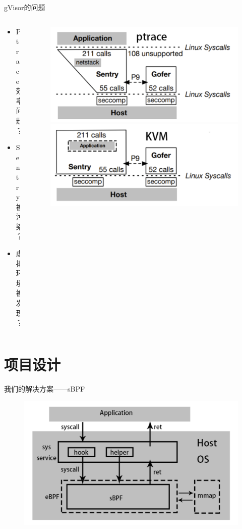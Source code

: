 \documentclass[UTF8,aspectratio=169,fontset=macnew,xcolor=table]{ctexbeamer}
\begin{document}
\begin{frame}{gVisor的问题}
    \begin{columns}
        \begin{column}{0.5\textwidth}
            \begin{itemize}
                \item Ptrace效率问题？
                \item Sentry被污染？
                \item 虚拟环境被发现？
            \end{itemize}
        \end{column}

        \begin{column}{0.5\textwidth}
            \begin{figure}[H]
                \centering
                \includegraphics[width=0.8\columnwidth]{pic2.png}
                \includegraphics[width=0.8\columnwidth]{pic3.png}
            \end{figure}
        \end{column}
    \end{columns}
\end{frame}

\section{项目设计}

\begin{frame}{我们的解决方案——sBPF}
    \begin{figure}[H]
        \centering
        \includegraphics[width=0.68\columnwidth]{pic4.png}
    \end{figure}
\end{frame}
\end{document}

